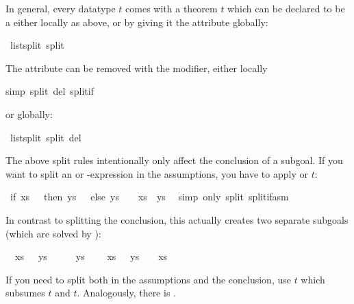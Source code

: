 \begin{isabellebody}
\begin{isamarkuptext}
In general, every datatype $t$ comes with a theorem
$t$ which can be declared to be a  either
locally as above, or by giving it the  attribute globally:%
\end{isamarkuptext}%
\ list{\isachardot}split\ {\isacharbrackleft}split{\isacharbrackright}%
\begin{isamarkuptext}%
\noindent
The  attribute can be removed with the  modifier,
either locally%
\end{isamarkuptext}%
simp\ split\ del{\isacharcolon}\ split{\isacharunderscore}if{\isacharparenright}%
\begin{isamarkuptext}%
\noindent
or globally:%
\end{isamarkuptext}%
\ list{\isachardot}split\ {\isacharbrackleft}split\ del{\isacharbrackright}%
\begin{isamarkuptext}%
The above split rules intentionally only affect the conclusion of a
subgoal.  If you want to split an  or -expression in
the assumptions, you have to apply  or
$t$:%
\end{isamarkuptext}%
\ {\isachardoublequote}if\ xs\ {\isacharequal}\ {\isacharbrackleft}{\isacharbrackright}\ then\ ys\ {\isachartilde}{\isacharequal}\ {\isacharbrackleft}{\isacharbrackright}\ else\ ys\ {\isacharequal}\ {\isacharbrackleft}{\isacharbrackright}\ {\isacharequal}{\isacharequal}{\isachargreater}\ xs\ {\isacharat}\ ys\ {\isachartilde}{\isacharequal}\ {\isacharbrackleft}{\isacharbrackright}{\isachardoublequote}\isanewline
{}simp\ only{\isacharcolon}\ split{\isacharcolon}\ split{\isacharunderscore}if{\isacharunderscore}asm{\isacharparenright}%
\begin{isamarkuptext}%
\noindent
In contrast to splitting the conclusion, this actually creates two
separate subgoals (which are solved by ):
\begin{isabelle}
\ \ {\isasymlbrakk}\mbox{xs}\ {\isacharequal}\ {\isacharbrackleft}{\isacharbrackright}{\isacharsemicolon}\ \mbox{ys}\ {\isasymnoteq}\ {\isacharbrackleft}{\isacharbrackright}{\isasymrbrakk}\ {\isasymLongrightarrow}\ {\isacharbrackleft}{\isacharbrackright}\ {\isacharat}\ \mbox{ys}\ {\isasymnoteq}\ {\isacharbrackleft}{\isacharbrackright}\isanewline
\ \ {\isasymlbrakk}\mbox{xs}\ {\isasymnoteq}\ {\isacharbrackleft}{\isacharbrackright}{\isacharsemicolon}\ \mbox{ys}\ {\isacharequal}\ {\isacharbrackleft}{\isacharbrackright}{\isasymrbrakk}\ {\isasymLongrightarrow}\ \mbox{xs}\ {\isacharat}\ {\isacharbrackleft}{\isacharbrackright}\ {\isasymnoteq}\ {\isacharbrackleft}{\isacharbrackright}
\end{isabelle}
If you need to split both in the assumptions and the conclusion,
use $t$ which subsumes $t$ and
$t$. Analogously, there is .


\end{isamarkuptext}
\end{isabellebody}
